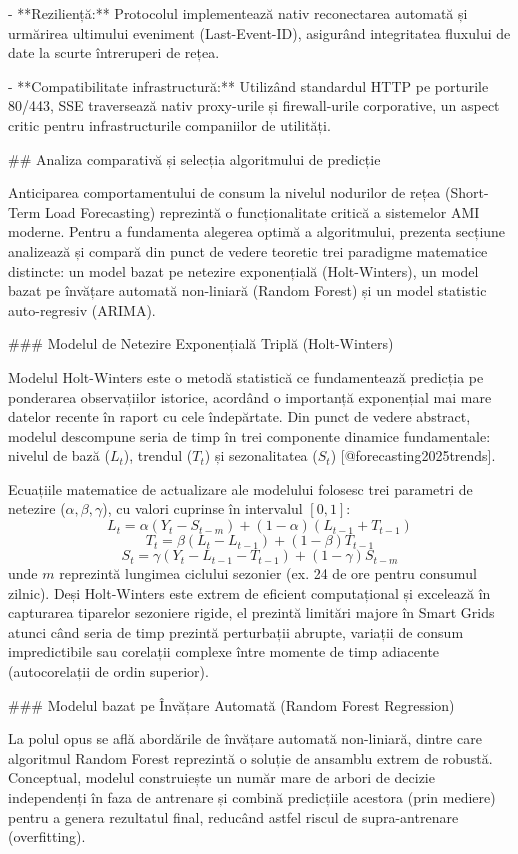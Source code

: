 - **Reziliență:** Protocolul implementează nativ reconectarea automată
  și urmărirea ultimului eveniment (Last-Event-ID), asigurând
  integritatea fluxului de date la scurte întreruperi de rețea.

- **Compatibilitate infrastructură:** Utilizând standardul HTTP pe
  porturile 80/443, SSE traversează nativ proxy-urile și firewall-urile
  corporative, un aspect critic pentru infrastructurile companiilor de
  utilități.

## Analiza comparativă și selecția algoritmului de predicție

Anticiparea comportamentului de consum la nivelul nodurilor de rețea
(Short-Term Load Forecasting) reprezintă o funcționalitate critică a
sistemelor AMI moderne. Pentru a fundamenta alegerea optimă a
algoritmului, prezenta secțiune analizează și compară din punct de
vedere teoretic trei paradigme matematice distincte: un model bazat pe
netezire exponențială (Holt-Winters), un model bazat pe învățare
automată non-liniară (Random Forest) și un model statistic auto-regresiv
(ARIMA).

### Modelul de Netezire Exponențială Triplă (Holt-Winters)

Modelul Holt-Winters este o metodă statistică ce fundamentează predicția
pe ponderarea observațiilor istorice, acordând o importanță exponențial
mai mare datelor recente în raport cu cele îndepărtate. Din punct de
vedere abstract, modelul descompune seria de timp în trei componente
dinamice fundamentale: nivelul de bază ($L_t$), trendul ($T_t$) și
sezonalitatea ($S_t$) [@forecasting2025trends].

Ecuațiile matematice de actualizare ale modelului folosesc trei
parametri de netezire ($\alpha, \beta, \gamma$), cu valori cuprinse în
intervalul $[0, 1]$:
$$L_t = \alpha(Y_t - S_{t-m}) + (1-\alpha)(L_{t-1} + T_{t-1})$$
$$T_t = \beta(L_t - L_{t-1}) + (1-\beta)T_{t-1}$$
$$S_t = \gamma(Y_t - L_{t-1} - T_{t-1}) + (1-\gamma)S_{t-m}$$ unde $m$
reprezintă lungimea ciclului sezonier (ex. 24 de ore pentru consumul
zilnic). Deși Holt-Winters este extrem de eficient computațional și
excelează în capturarea tiparelor sezoniere rigide, el prezintă limitări
majore în Smart Grids atunci când seria de timp prezintă perturbații
abrupte, variații de consum impredictibile sau corelații complexe între
momente de timp adiacente (autocorelații de ordin superior).

### Modelul bazat pe Învățare Automată (Random Forest Regression)

La polul opus se află abordările de învățare automată non-liniară,
dintre care algoritmul Random Forest reprezintă o soluție de ansamblu
extrem de robustă. Conceptual, modelul construiește un număr mare de
arbori de decizie independenți în faza de antrenare și combină
predicțiile acestora (prin mediere) pentru a genera rezultatul final,
reducând astfel riscul de supra-antrenare (overfitting).

